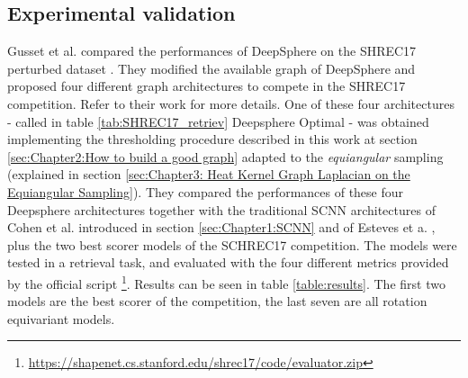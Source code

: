 \subsection{Experimental validation}
\label{sec:Chapter1:Experimental validation}
Gusset et al. \cite{Gusset} compared the performances of DeepSphere on the SHREC17 perturbed dataset \cite{SHREC17}. They modified the available graph of DeepSphere and proposed four different graph architectures to compete in the SHREC17 competition. Refer to their work for more details. One of these four architectures - called in table \ref{tab:SHREC17_retriev} Deepsphere Optimal - was obtained implementing the thresholding procedure described in this work at section \ref{sec:Chapter2:How to build a good graph} adapted to the \textit{equiangular} sampling (explained in section \ref{sec:Chapter3: Heat Kernel Graph Laplacian on the Equiangular Sampling}). They compared the performances of these four Deepsphere architectures together with the traditional SCNN architectures of Cohen et al. \cite{SCNN} introduced in section \ref{sec:Chapter1:SCNN} and of Esteves et a. \cite{Esteves}, plus the two best scorer models of the SCHREC17 competition. The models were tested in a retrieval task, and evaluated with the four different metrics provided by the official script \footnote{\url{https://shapenet.cs.stanford.edu/shrec17/code/evaluator.zip}}. Results can be seen in table \ref{table:results}.  The first two models are the best scorer of the competition, the last seven are all rotation equivariant models.

